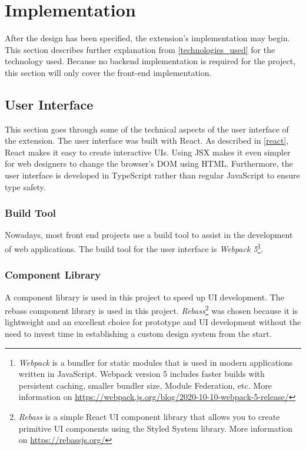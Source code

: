 \newpage
\chapter{Implementation}
After the design has been specified, the extension's implementation may begin. This section describes further explanation from \autoref{technologies_used} for the technology used. Because no backend implementation is required for the project, this section will only cover the front-end implementation.

\section{User Interface}
This section goes through some of the technical aspects of the user interface of the extension. The user interface was built with React. As described in \autoref{react}, React makes it easy to create interactive UIs. Using JSX makes it even simpler for web designers to change the browser's DOM using HTML. Furthermore, the user interface is developed in TypeScript rather than regular JavaScript to ensure type safety.

\subsection{Build Tool}
Nowadays, most front end projects use a build tool to assist in the development of web applications. The build tool for the user interface is \emph{Webpack 5}\footnote{\emph{Webpack} is a bundler for static modules that is used in modern applications written in JavaScript. Webpack version 5 includes faster builds with persistent caching, smaller bundler size, Module Federation, etc. More information on \url{https://webpack.js.org/blog/2020-10-10-webpack-5-release/}}.

\subsection{Component Library}
A component library is used in this project to speed up UI development. The rebass component library is used in this project. \emph{Rebass}\footnote{\emph{Rebass} is a simple React UI component library that allows you to create primitive UI components using the Styled System library. More information on \url{https://rebassjs.org/}} was chosen because it is lightweight and an excellent choice for prototype and UI development without the need to invest time in establishing a custom design system from the start.


